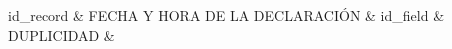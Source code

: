 
	id\_record &  \tabularnewline\hline 
	FECHA Y HORA DE LA DECLARACI\'ON &  \tabularnewline\hline 
	id\_field &  \tabularnewline\hline 
	DUPLICIDAD &  \tabularnewline\hline 

